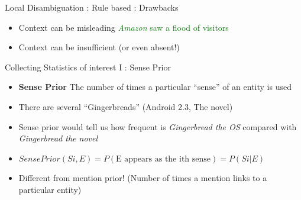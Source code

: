 \documentclass{beamer}
\begin{document}
\begin{frame}{Local Disambiguation : Rule based : Drawbacks}
\begin{itemize}
 \item Context can be misleading \bigskip
 \textcolor{green}{\emph{Amazon} saw a flood of visitors} \bigskip
 \item Context can be insufficient (or even absent!)
 
\end{itemize}

 
\end{frame}


\begin{frame}{Collecting Statistics of interest I : Sense Prior}
\begin{itemize}

\item \textbf{Sense Prior} The number of times a particular ``sense'' of an entity is used \medskip
\item There are several ``Gingerbreads'' (Android 2.3, The novel) \medskip
\item Sense prior would tell us how frequent is \emph{Gingerbread the OS} compared with \emph{Gingerbread the novel}  \medskip
\item $Sense Prior(Si , E) = P (\text{E appears as the ith sense}) = P (Si |E) $ \medskip
\item Different from mention prior! (Number of times a mention links to a particular entity)
\end{itemize}
\end{frame}
\end{document}
